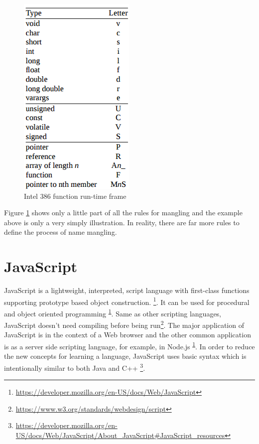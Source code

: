         
        \begin{figure}[H]
            \centering
            \includegraphics[scale = 0.6]
            {Images/concepts/namemangling.png}
            \caption[Intel 386 function run-time frame]%
            {Intel 386  function run-time frame\cite{LAL-00}}  
            \label{fig:nameMangling}
        \end{figure}
        
    Figure \ref{fig:nameMangling} shows only a little part of all the rules for mangling and the example above is only a very simply illustration. In reality, there are far more rules to define the process of name mangling. 
        
    
\section{JavaScript}

    JavaScript is a lightweight, interpreted, script language with first-class functions supporting prototype based object construction. \footnote{\label{foot:MDN1}\url{https://developer.mozilla.org/en-US/docs/Web/JavaScript}}. It can be used for procedural and object oriented programming \textsuperscript{\ref{foot:MDN1}}. Same as other scripting languages, JavaScript doesn't need compiling before being run\footnote{\label{foot:w3}\url{https://www.w3.org/standards/webdesign/script}}. The major application of JavaScript is in the context of a Web browser and the other common application is as a server side scripting language, for example, in Node.js \textsuperscript{\ref{foot:MDN1}}. In order to reduce the new concepts for learning a language, JavaScript uses basic syntax which is intentionally similar to both Java and C++ \footnote{\label{foot:MDN2}\url{https://developer.mozilla.org/en-US/docs/Web/JavaScript/About\_JavaScript\#JavaScript\_resources}}.
    
